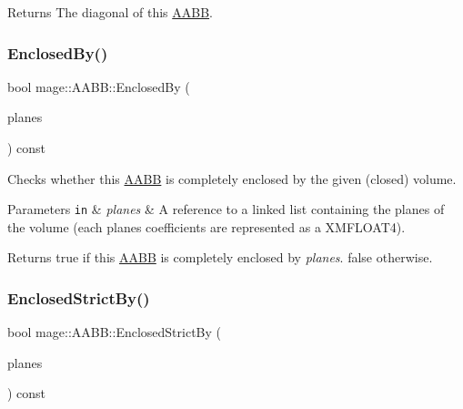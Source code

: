 \begin{DoxyReturn}{Returns}
The diagonal of this \hyperlink{structmage_1_1_a_a_b_b}{A\+A\+BB}. 
\end{DoxyReturn}
\hypertarget{structmage_1_1_a_a_b_b_a7d4cd9138aa14aa79fba35a266634dac}{}\label{structmage_1_1_a_a_b_b_a7d4cd9138aa14aa79fba35a266634dac} 
\subsubsection{\texorpdfstring{Enclosed\+By()}{EnclosedBy()}}
{\footnotesize\ttfamily bool mage\+::\+A\+A\+B\+B\+::\+Enclosed\+By (\begin{DoxyParamCaption}\item[{const list$<$ X\+M\+F\+L\+O\+A\+T4 $>$ \&}]{planes }\end{DoxyParamCaption}) const}

Checks whether this \hyperlink{structmage_1_1_a_a_b_b}{A\+A\+BB} is completely enclosed by the given (closed) volume.


\begin{DoxyParams}[1]{Parameters}
\mbox{\tt in}  & {\em planes} & A reference to a linked list containing the planes of the volume (each plane\textquotesingle{}s coefficients are represented as a {\ttfamily X\+M\+F\+L\+O\+A\+T4}). \\
\hline
\end{DoxyParams}
\begin{DoxyReturn}{Returns}
{\ttfamily true} if this \hyperlink{structmage_1_1_a_a_b_b}{A\+A\+BB} is completely enclosed by {\itshape planes}. {\ttfamily false} otherwise. 
\end{DoxyReturn}
\hypertarget{structmage_1_1_a_a_b_b_a098cdfecc66ce8a1e557280aafda33e3}{}\label{structmage_1_1_a_a_b_b_a098cdfecc66ce8a1e557280aafda33e3} 
\subsubsection{\texorpdfstring{Enclosed\+Strict\+By()}{EnclosedStrictBy()}}
{\footnotesize\ttfamily bool mage\+::\+A\+A\+B\+B\+::\+Enclosed\+Strict\+By (\begin{DoxyParamCaption}\item[{const list$<$ X\+M\+F\+L\+O\+A\+T4 $>$ \&}]{planes }\end{DoxyParamCaption}) const}

